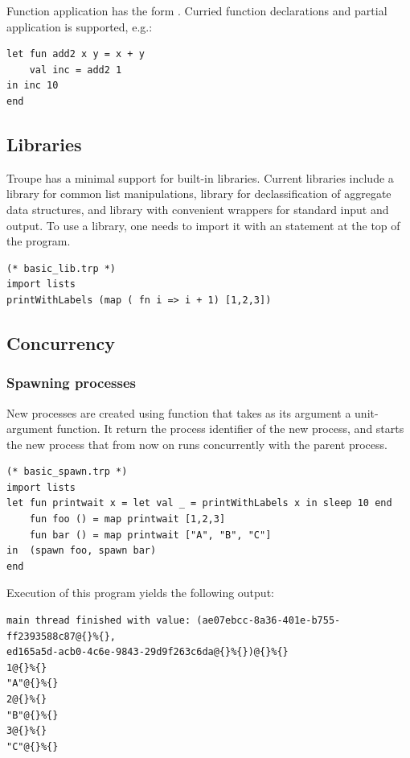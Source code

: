 Function application has the form . Curried function declarations and partial 
application is supported, e.g.:
\begin{lstlisting}
let fun add2 x y = x + y 
    val inc = add2 1 
in inc 10
end    
\end{lstlisting}



\subsection{Libraries}
\label{sec:labels}
Troupe has a minimal support for built-in libraries. Current libraries include a library  for common list manipulations, library   for declassification of aggregate data structures, and library
 with convenient wrappers for standard input and output. To use a library, one needs to import it with an  statement at the top of the program.
\begin{lstlisting}
(* basic_lib.trp *)
import lists 
printWithLabels (map ( fn i => i + 1) [1,2,3])
\end{lstlisting}



\subsection{Concurrency} 
\label{sec:concurrency}
\subsubsection{Spawning processes}
New processes are created using  function that takes as its argument a unit-argument function. 
It return the process identifier of the new process, and starts the new process that from now on runs concurrently with the 
parent process.
\begin{lstlisting}
(* basic_spawn.trp *)
import lists
let fun printwait x = let val _ = printWithLabels x in sleep 10 end
    fun foo () = map printwait [1,2,3]
    fun bar () = map printwait ["A", "B", "C"]
in  (spawn foo, spawn bar)
end
\end{lstlisting}
Execution of this program yields the following output:
\begin{verbatim}
main thread finished with value: (ae07ebcc-8a36-401e-b755-ff2393588c87@{}%{}, 
ed165a5d-acb0-4c6e-9843-29d9f263c6da@{}%{})@{}%{}
1@{}%{}
"A"@{}%{}
2@{}%{}
"B"@{}%{}
3@{}%{}
"C"@{}%{}
\end{verbatim}

